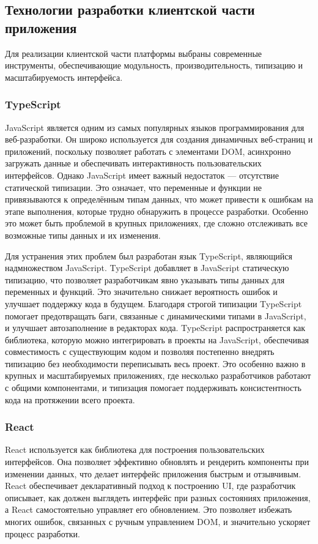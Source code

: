 \subsection*{Технологии разработки клиентской части приложения}

Для реализации клиентской части платформы выбраны современные инструменты, обеспечивающие модульность, производительность, типизацию и масштабируемость интерфейса.

\subsubsection*{TypeScript}

JavaScript является одним из самых популярных языков программирования для веб-разработки. Он широко используется для создания динамичных веб-страниц и приложений, поскольку позволяет работать с элементами DOM, асинхронно загружать данные и обеспечивать интерактивность пользовательских интерфейсов. Однако JavaScript имеет важный недостаток — отсутствие статической типизации. Это означает, что переменные и функции не привязываются к определённым типам данных, что может привести к ошибкам на этапе выполнения, которые трудно обнаружить в процессе разработки. Особенно это может быть проблемой в крупных приложениях, где сложно отслеживать все возможные типы данных и их изменения.

Для устранения этих проблем был разработан язык TypeScript, являющийся надмножеством JavaScript. TypeScript добавляет в JavaScript статическую типизацию, что позволяет разработчикам явно указывать типы данных для переменных и функций. Это значительно снижает вероятность ошибок и улучшает поддержку кода в будущем. Благодаря строгой типизации TypeScript помогает предотвращать баги, связанные с динамическими типами в JavaScript, и улучшает автозаполнение в редакторах кода. TypeScript распространяется как библиотека, которую можно интегрировать в проекты на JavaScript, обеспечивая совместимость с существующим кодом и позволяя постепенно внедрять типизацию без необходимости переписывать весь проект. Это особенно важно в крупных и масштабируемых приложениях, где несколько разработчиков работают с общими компонентами, и типизация помогает поддерживать консистентность кода на протяжении всего проекта.


\subsubsection*{React}
React используется как библиотека для построения пользовательских интерфейсов. Она позволяет эффективно обновлять и рендерить компоненты при изменении данных, что делает интерфейс приложения быстрым и отзывчивым. React обеспечивает декларативный подход к построению UI, где разработчик описывает, как должен выглядеть интерфейс при разных состояниях приложения, а React самостоятельно управляет его обновлением. Это позволяет избежать многих ошибок, связанных с ручным управлением DOM, и значительно ускоряет процесс разработки.

